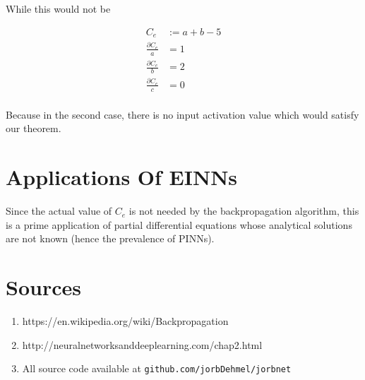 \documentclass[8pt]{amsart}
\begin{document}
While this would not be

\[
\begin{aligned}
    C_e &:= a + b - 5 \\
    \frac{\partial C_e}{a} &= 1 \\
    \frac{\partial C_e}{b} &= 2 \\
    \frac{\partial C_e}{c} &= 0 \\
\end{aligned}
\]

Because in the second case, there is no input activation value which
would satisfy our theorem.

\section{Applications Of EINNs}

Since the actual value of $C_e$ is not needed by the backpropagation algorithm,
this is a prime application of partial differential equations whose analytical
solutions are not known (hence the prevalence of PINNs).

\section{Sources}

\begin{enumerate}
    \item{https://en.wikipedia.org/wiki/Backpropagation}
    \item{http://neuralnetworksanddeeplearning.com/chap2.html}
    \item{All source code available at \verb|github.com/jorbDehmel/jorbnet|}
\end{enumerate}
\end{document}
